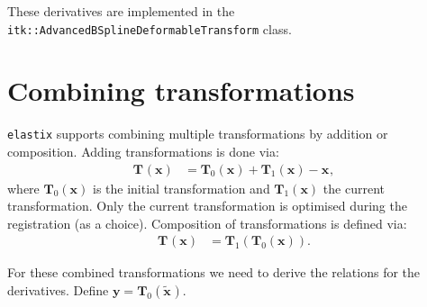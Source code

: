 \documentclass[]{article}
\newcommand{\vT}{\bm{T}}
\newcommand{\vTx}[1][]{\bm{T}_{#1}(\bm{x})}
\newcommand{\vx}[1][]{\bm{x}_{#1}}
\newcommand{\vxt}[1][]{\bm{\widetilde x}_{#1}}
\begin{document}
These derivatives are implemented in the
\texttt{itk::AdvancedBSplineDeformableTransform} class.

\section{Combining transformations}

\texttt{elastix} supports combining multiple transformations by
addition or composition. Adding transformations is done via:
\begin{align}
\vTx &= \vTx[0] + \vTx[1] - \vx,
\end{align}
where $\vTx[0]$ is the initial transformation and $\vTx[1]$ the
current transformation. Only the current transformation is optimised
during the registration (as a choice). Composition of
transformations is defined via:
\begin{align}
\vTx &= \vT_1(\vTx[0]).
\end{align}

For these combined transformations we need to derive the relations
for the derivatives. Define $\bm{y} = \vT_0(\vxt)$.
\end{document}
